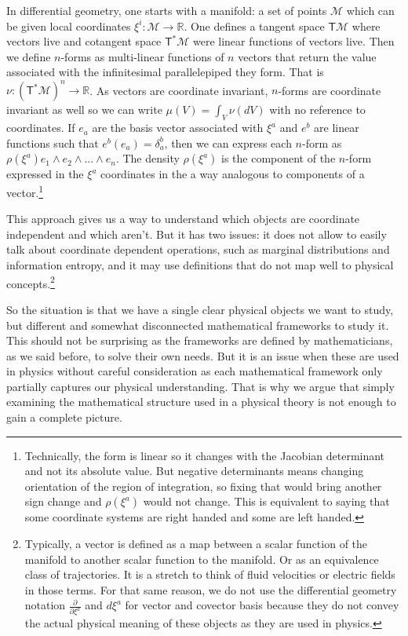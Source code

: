 \documentclass[11pt]{article}
\begin{document}
In differential geometry, one starts with a manifold: a set of points $\mathcal{M}$ which can be given local coordinates $\xi^i : \mathcal{M} \to \mathbb{R}$. One defines a tangent space $\mathsf{T}\mathcal{M}$ where vectors live and cotangent space $\mathsf{T}^*\mathcal{M}$ were linear functions of vectors live. Then we define $n$-forms as multi-linear functions of $n$ vectors that return the value associated with the infinitesimal parallelepiped they form. That is $\nu : (\mathsf{T}^*\mathcal{M})^n \rightarrow \mathbb{R}$. As vectors are coordinate invariant, $n$-forms are coordinate invariant as well so we can write $\mu(V)=\int_V \nu(dV)$ with no reference to coordinates. If $e_a$ are the basis vector associated with $\xi^a$ and $e^b$ are linear functions such that $e^b(e_a)=\delta_a^b$, then we can express each $n$-form as $\rho(\xi^a)e_1\wedge e_2 \wedge ... \wedge e_n$. The density $\rho(\xi^a)$ is the component of the $n$-form expressed in the $\xi^a$ coordinates in the a way analogous to components of a vector.\footnote{Technically, the form is linear so it changes with the Jacobian determinant and not its absolute value. But negative determinants means changing orientation of the region of integration, so fixing that would bring another sign change and $\rho(\xi^a)$ would not change. This is equivalent to saying that some coordinate systems are right handed and some are left handed.}

This approach gives us a way to understand which objects are coordinate independent and which aren't. But it has two issues: it does not allow to easily talk about coordinate dependent operations, such as marginal distributions and information entropy, and it may use definitions that do not map well to physical concepts.\footnote{Typically, a vector is defined as a map between a scalar function of the manifold to another scalar function to the manifold. Or as an equivalence class of trajectories. It is a stretch to think of fluid velocities or electric fields in those terms. For that same reason, we do not use the differential geometry notation $\frac{\partial}{\partial \xi^a}$ and $d\xi^a$ for vector and covector basis because they do not convey the actual physical meaning of these objects as they are used in physics.}

So the situation is that we have a single clear physical objects we want to study, but different and somewhat disconnected mathematical frameworks to study it. This should not be surprising as the frameworks are defined by mathematicians, as we said before, to solve their own needs. But it is an issue when these are used in physics without careful consideration as each mathematical framework only partially captures our physical understanding. That is why we argue that simply examining the mathematical structure used in a physical theory is not enough to gain a complete picture.
\end{document}
